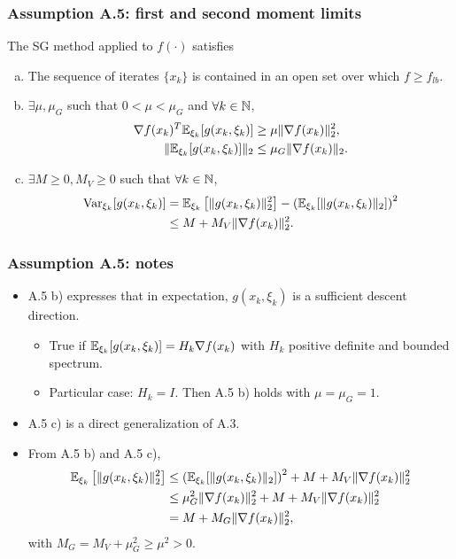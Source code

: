 \documentclass[usepdftitle=false, aspectratio=169]{beamer}
\begin{document}
\begin{frame}
\frametitle{Assumption A.5: first and second moment limits}

The SG method applied to $f(\cdot)$ satisfies
\begin{enumerate}[a)]
\item
The sequence of iterates $\{ x_k \}$ is contained in an open set over which $f \geq f_{lb}$.
\item
$\exists \mu, \mu_G$ such that $0 < \mu < \mu_G$ and $\forall k \in {\mathbb{N}}$,
\begin{align*}
\nabla f(x_k)^T {\mathbb{E}}_{\xi_k} [g(x_k, \xi_k)] &\geq \mu \| \nabla f(x_k) \|_2^2, \\
\| {\mathbb{E}}_{\xi_k} [g(x_k, \xi_k)] \|_2 &\leq \mu_G \| \nabla f(x_k) \|_2.
\end{align*}
\item
$\exists M \geq 0, M_V \geq 0$ such that $\forall k \in {\mathbb{N}}$,
\begin{align*}
\operatorname{Var}_{\xi_k} [g(x_k, \xi_k)]
&= {\mathbb{E}}_{\xi_k} \left[ \| g(x_k, \xi_k) \|^2_2 \right] - \left( {\mathbb{E}}_{\xi_k} [\| g(x_k, \xi_k) \|_2] \right)^2 \\
&\leq M + M_V \| \nabla f(x_k) \|_2^2.
\end{align*}
\end{enumerate}
	
\end{frame}

\begin{frame}
\frametitle{Assumption A.5: notes}

\begin{itemize}
\item
A.5 b) expresses that in expectation, $g(x_k, \xi_k)$ is a sufficient descent direction.
\begin{itemize}
	\item True if ${\mathbb{E}}_{\xi_k} [g(x_k, \xi_k)] = H_k \nabla f(x_k)$ with $H_k$ positive definite and bounded spectrum.
	\item Particular case: $H_k = I$. Then A.5 b) holds with $\mu = \mu_G = 1$. 
\end{itemize}
\item 
A.5 c) is a direct generalization of A.3.
\item
From A.5 b) and A.5 c),
\begin{align*}
{\mathbb{E}}_{\xi_k} \left[ \| g(x_k, \xi_k) \|^2_2 \right]
& \leq \left( {\mathbb{E}}_{\xi_k} [\| g(x_k, \xi_k) \|_2] \right)^2 + M + M_V \| \nabla f(x_k) \|_2^2 \\
& \leq \mu_G^2 \| \nabla f(x_k) \|_2^2 + M + M_V \| \nabla f(x_k) \|_2^2 \\
& = M + M_G \| \nabla f(x_k) \|_2^2,
\end{align*}
with $M_G = M_V + \mu_G^2 \geq \mu^2 > 0$.
\end{itemize}
\end{frame}
\end{document}
